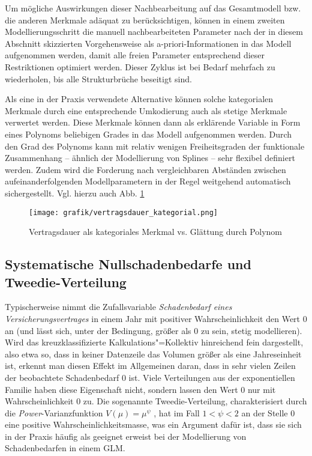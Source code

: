Um mögliche Auswirkungen dieser Nachbearbeitung auf das Gesamtmodell bzw. die anderen Merkmale adäquat zu berücksichtigen, können in einem zweiten Modellierungsschritt die manuell nachbearbeiteten Parameter nach der in diesem Abschnitt skizzierten Vorgehensweise als a-priori-Informationen in das Modell aufgenommen werden, damit alle freien Parameter entsprechend dieser Restriktionen optimiert werden. Dieser Zyklus ist bei Bedarf mehrfach zu wiederholen, bis alle Strukturbrüche beseitigt sind.

Als eine in der Praxis verwendete Alternative können solche kategorialen Merkmale durch eine entsprechende Umkodierung auch als stetige Merkmale verwertet werden. Diese Merkmale können dann als erklärende Variable in Form eines Polynoms beliebigen Grades in das Modell aufgenommen werden. Durch den Grad des Polynoms kann mit relativ wenigen Freiheitsgraden der funktionale Zusammenhang – ähnlich der Modellierung von Splines – sehr flexibel definiert werden. Zudem wird die Forderung nach vergleichbaren Abständen zwischen aufeinanderfolgenden Modellparametern in der Regel weitgehend automatisch sichergestellt. Vgl. hierzu auch Abb. \ref{fig:vertragsdauer_kategorial}



\begin{figure}  %
	\centering
  \texttt{[image: grafik/vertragsdauer\_kategorial.png]}
      \caption{Vertragsdauer als kategoriales Merkmal vs. Glättung durch Polynom}
	\label{fig:vertragsdauer_kategorial}
	
\end{figure} 	 


\subsection{Systematische Nullschadenbedarfe und Tweedie-Verteilung}\label{Tweedie}

Typischerweise nimmt die Zufallsvariable \textit{Schadenbedarf eines Versicherungsvertrages} in einem Jahr mit positiver Wahrscheinlichkeit den Wert 0 an (und lässt sich, unter der Bedingung, größer als 0 zu sein, stetig modellieren). Wird das kreuzklassifizierte Kalkulations"=Kollektiv hinreichend fein dargestellt, also etwa so, dass in keiner Datenzeile das Volumen größer als eine Jahreseinheit ist, erkennt man diesen Effekt im Allgemeinen daran, dass in sehr vielen Zeilen der beobachtete Schadenbedarf 0 ist. Viele Verteilungen aus der exponentiellen Familie haben diese Eigenschaft nicht, sondern lassen den Wert 0 nur mit Wahrscheinlichkeit 0 zu. Die sogenannte Tweedie-Verteilung, charakterisiert durch die \textit{Power}-Varianzfunktion $V(\mu)=\mu^\psi$  , hat im Fall $1<\psi<2$  an der Stelle 0 eine positive Wahrscheinlichkeitsmasse, was ein Argument dafür ist, dass sie sich in der Praxis häufig als geeignet erweist bei der Modellierung von Schadenbedarfen in einem GLM.






